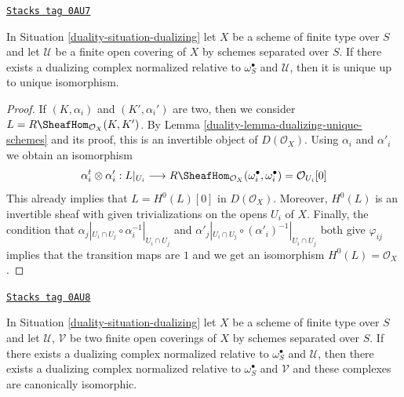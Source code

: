 \begin{lemma}
\label{duality-lemma-good-dualizing-unique}
\href{https://stacks.math.columbia.edu/tag/0AU7}{\texttt{Stacks tag 0AU7}}

In Situation \ref{duality-situation-dualizing} let $X$ be a scheme of finite type
over $S$ and let $\mathcal{U}$ be a finite open covering of $X$
by schemes separated over $S$. If there exists a dualizing complex
normalized relative to $\omega_S^\bullet$ and $\mathcal{U}$, then it is unique
up to unique isomorphism.
\end{lemma}

\begin{proof}

If $(K, \alpha_i)$ and $(K', \alpha_i')$ are two, then we consider
$L = R\SheafHom_{\mathcal{O}_X}(K, K')$.
By Lemma \ref{duality-lemma-dualizing-unique-schemes}
and its proof, this is an invertible object of $D(\mathcal{O}_X)$.
Using $\alpha_i$ and $\alpha'_i$ we obtain an isomorphism
$$
\alpha_i^t \otimes \alpha'_i :
L|_{U_i} \longrightarrow
R\SheafHom_{\mathcal{O}_X}(\omega_i^\bullet, \omega_i^\bullet) =
\mathcal{O}_{U_i}[0]
$$
This already implies that $L = H^0(L)[0]$ in $D(\mathcal{O}_X)$.
Moreover, $H^0(L)$ is an invertible sheaf with given trivializations
on the opens $U_i$ of $X$. Finally, the condition that
$\alpha_j|_{U_i \cap U_j} \circ \alpha_i^{-1}|_{U_i \cap U_j}$
and
$\alpha'_j|_{U_i \cap U_j} \circ (\alpha'_i)^{-1}|_{U_i \cap U_j}$
both give $\varphi_{ij}$ implies that the transition maps
are $1$ and we get an isomorphism $H^0(L) = \mathcal{O}_X$.
\end{proof}

\begin{lemma}
\label{duality-lemma-good-dualizing-independence-covering}
\href{https://stacks.math.columbia.edu/tag/0AU8}{\texttt{Stacks tag 0AU8}}

In Situation \ref{duality-situation-dualizing} let $X$ be a scheme of finite type
over $S$ and let $\mathcal{U}$, $\mathcal{V}$ be two finite open coverings
of $X$ by schemes separated over $S$.
If there exists a dualizing complex normalized
relative to $\omega_S^\bullet$ and $\mathcal{U}$, then
there exists a dualizing complex normalized relative to
$\omega_S^\bullet$ and $\mathcal{V}$ and these complexes are
canonically isomorphic.
\end{lemma}

